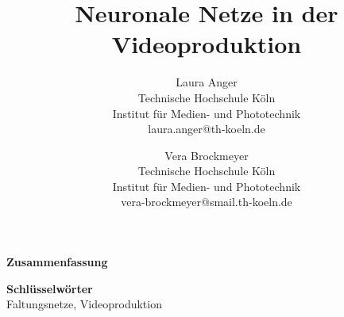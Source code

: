 \documentclass[times, 12pt,twocolumn]{article}
\begin{document}
\title{Neuronale Netze in der Videoproduktion}

\author{Laura Anger\\
Technische Hochschule K\"oln \\ Institut f\"ur Medien- und Phototechnik \\  laura.anger@th-koeln.de \\
\and
Vera Brockmeyer\\
Technische Hochschule K\"oln \\ Institut f\"ur Medien- und Phototechnik \\ vera-brockmeyer@smail.th-koeln.de \\
}

\maketitle
\thispagestyle{empty}


\large{\textbf{Zusammenfassung}}\\ \small %
{} 

\large{\textbf{Schl\"usselw\"orter}}\\ \small %
 Faltungsnetze, Videoproduktion


 \label{sec:Einleitung}
\end{document}
